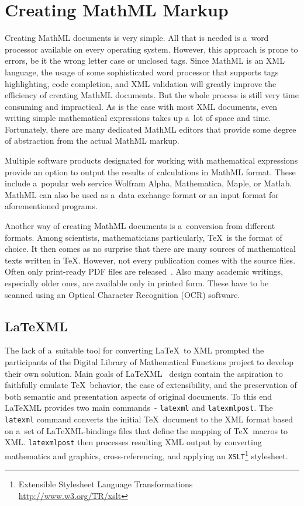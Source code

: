 \documentclass[11pt,oneside,final]{fithesis2}
\begin{document}
\section{Creating MathML Markup}
\label{sec:create-mathml}
Creating MathML documents is very simple. All that is needed is a~word processor available on every operating system. However, this approach is prone to errors, be it the wrong letter case or unclosed tags. Since MathML is an XML language, the usage of some sophisticated word processor that supports tags highlighting, code completion, and XML validation will greatly improve the efficiency of creating MathML documents. But the whole process is still very time consuming and impractical. As is the case with most XML documents, even writing simple mathematical expressions takes up a~lot of space and time. Fortunately, there are many dedicated MathML editors that provide some degree of abstraction from the actual MathML markup.

Multiple software products designated for working with mathematical expressions provide an option to output the results of calculations in MathML format. These include a~popular web service Wolfram Alpha, Mathematica, Maple, or Matlab. MathML can also be used as a~data exchange format or an input format for aforementioned programs.

Another way of creating MathML documents is a~conversion from different formats. Among scientists, mathematicians particularly, \TeX\ is the format of choice. It then comes as no surprise that there are many sources of mathematical texts written in \TeX. However, not every publication comes with the source files. Often only print-ready PDF files are released~\cite{baker2011towards}. Also many academic writings, especially older ones, are available only in printed form. These have to be scanned using an Optical Character Recognition (OCR) software. 

\subsection{\LaTeX ML}
\label{section:latexml}
The lack of a~suitable tool for converting \LaTeX\ to XML prompted the participants of the Digital Library of Mathematical Functions project to develop their own solution. Main goals of \LaTeX ML~\cite{latexml:miller2013} design contain the aspiration to faithfully emulate \TeX\ behavior, the ease of extensibility, and the preservation of both semantic and presentation aspects of original documents. To this end \LaTeX ML provides two main commands~- \texttt{latexml} and \texttt{latexmlpost}. The \texttt{latexml} command converts the initial \TeX\ document to the XML format based on a~set of \LaTeX ML-bindings files that define the mapping of \TeX\ macros to XML. \texttt{latexmlpost} then processes resulting XML output by converting mathematics
and graphics, cross-referencing, and applying an \texttt{XSLT}\footnote{Extensible Stylesheet Language Transformations \url{http://www.w3.org/TR/xslt}} stylesheet. 
\end{document}

